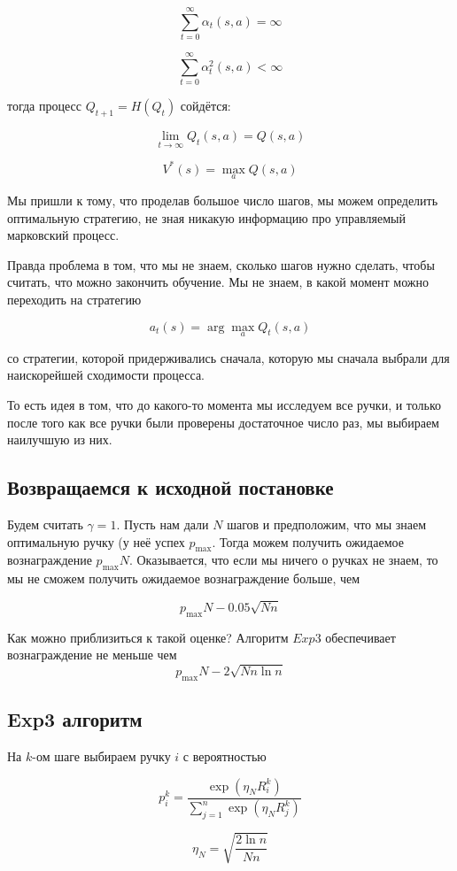 \documentclass[a4paper]{article}
\begin{document}
\[ \sum_{t=0}^\infty \alpha_t(s, a) = \infty \]

\[ \sum_{t=0}^\infty \alpha_t^2(s,a) < \infty  \]

тогда процесс $Q_{t+1} = H(Q_t)$ сойдётся:

\[ \lim_{t \rightarrow \infty} Q_t(s,a) = Q(s,a) \]

\[ V^*(s) = \max_{a} Q(s,a)  \]

Мы пришли к тому, что проделав большое число шагов, мы можем определить оптимальную стратегию, не зная никакую информацию про управляемый марковский процесс.

Правда проблема в том, что мы не знаем, сколько шагов нужно сделать, чтобы считать, что можно закончить обучение. Мы не знаем, в какой момент можно переходить на стратегию 

\[ a_t(s) = \arg \max_{a} Q_t(s,a) \]

со стратегии, которой придерживались сначала, которую мы сначала выбрали для наискорейшей сходимости процесса.

То есть идея в том, что до какого-то момента мы исследуем все ручки, и только после того как все ручки были проверены достаточное число раз, мы выбираем наилучшую из них.

\subsection*{Возвращаемся к исходной постановке}

Будем считать $\gamma = 1$.
Пусть нам дали $N$ шагов и предположим, что мы знаем оптимальную ручку (у неё успех $p_{\max}$. Тогда можем получить ожидаемое вознаграждение $p_{\max} N$. 
Оказывается, что если мы ничего о ручках не знаем, то мы не сможем получить ожидаемое вознаграждение больше, чем

\[ p_{\max} N - 0.05\sqrt{Nn} \]

Как можно приблизиться к такой оценке? Алгоритм $Exp3$ обеспечивает вознаграждение не меньше чем \[ p_{\max}N - 2\sqrt{Nn \ln n} \]

\subsection*{Exp3 алгоритм}

На $k$-ом шаге выбираем ручку $i$ с вероятностью 

\[ p_i^k = \frac{\exp(\eta_N R_i^k)}{\sum_{j=1}^n \exp(\eta_N R_j^k)} \]

\[ \eta_N = \sqrt{ \frac{2\ln n}{N n} }\]
\end{document}
